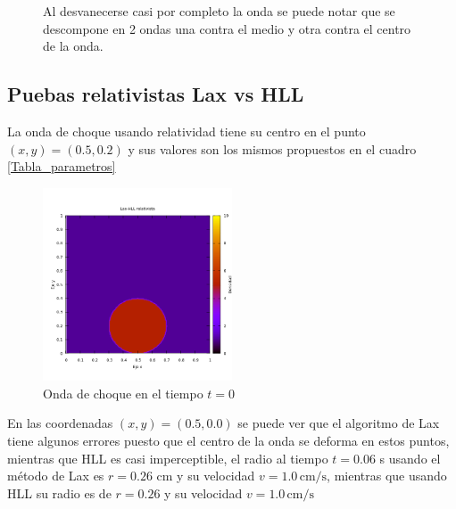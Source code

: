 \documentclass[12pt,a4paper]{book}
\begin{document}
\begin{figure}[H]
\caption{Al desvanecerse casi por completo la onda se puede notar que se descompone en 2 ondas una contra el medio y otra contra el centro de la onda.} \label{fig:Lax-hll-newtoniano2}
\end{figure}

\subsection{Puebas relativistas Lax vs HLL} %

La onda de choque usando relatividad tiene su centro en el punto $(x,y) = (0.5, 0.2)$ y sus valores son los mismos propuestos en el cuadro \ref{Tabla_parametros}

\begin{figure}[H]
\centering
\includegraphics[width=0.5\textwidth]{./Figuras/Pruebas/Prueba_onda_choque/onda_choque6_t_0}
\caption{Onda de choque en el tiempo $t = 0$} \label{fig:onda_choque6_t_0}
\end{figure}

En las coordenadas $(x,y) = (0.5, 0.0)$ se puede ver que el algoritmo de Lax tiene algunos errores puesto que el centro de la onda se deforma en estos puntos, mientras que HLL es casi imperceptible, el radio al tiempo $t=0.06$ s usando el método de Lax es $r = 0.26$ cm y su velocidad $v = 1.0 \, \mathrm{cm}/\mathrm{s}$, mientras que usando HLL su radio es de $r = 0.26$ y su velocidad $v = 1.0 \, \mathrm{cm}/\mathrm{s} $
\end{document}
